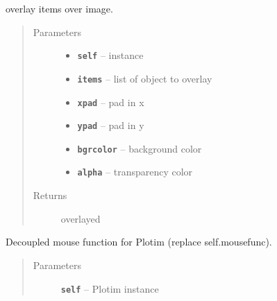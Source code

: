 \documentclass[letterpaper,10pt,english]{sphinxmanual}
\begin{document}
\begin{fulllineitems}
\begin{fulllineitems}
\end{fulllineitems}


\begin{fulllineitems}
\label{RRtoolbox.lib:RRtoolbox.lib.plotter.Plotim.makeoverlay}
overlay items over image.
\begin{quote}\begin{description}
\item[{Parameters}] \leavevmode\begin{itemize}
\item {} 
\textbf{\texttt{self}} -- instance

\item {} 
\textbf{\texttt{items}} -- list of object to overlay

\item {} 
\textbf{\texttt{xpad}} -- pad in x

\item {} 
\textbf{\texttt{ypad}} -- pad in y

\item {} 
\textbf{\texttt{bgrcolor}} -- background color

\item {} 
\textbf{\texttt{alpha}} -- transparency color

\end{itemize}

\item[{Returns}] \leavevmode
overlayed

\end{description}\end{quote}

\end{fulllineitems}


\begin{fulllineitems}
\label{RRtoolbox.lib:RRtoolbox.lib.plotter.Plotim.mousefunc}
Decoupled mouse function for Plotim (replace self.mousefunc).
\begin{quote}\begin{description}
\item[{Parameters}] \leavevmode
\textbf{\texttt{self}} -- Plotim instance


\end{description}
\end{quote}
\end{fulllineitems}
\end{fulllineitems}
\end{document}
